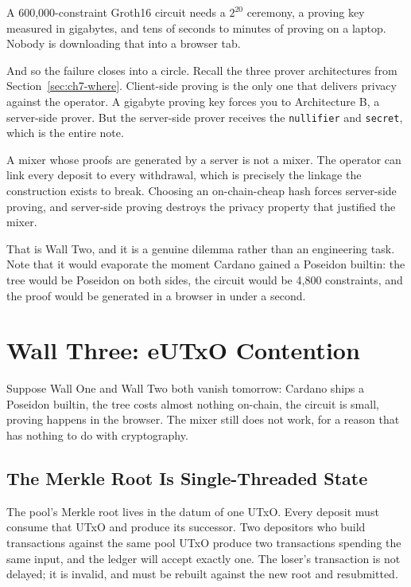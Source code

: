 A 600{,}000-constraint Groth16 circuit needs a $2^{20}$ ceremony, a proving key
measured in gigabytes, and tens of seconds to minutes of proving on a laptop.
Nobody is downloading that into a browser tab.

And so the failure closes into a circle. Recall the three prover architectures
from Section~\ref{sec:ch7-where}. Client-side proving is the only one that
delivers privacy against the operator. A gigabyte proving key forces you to
Architecture B, a server-side prover. But the server-side prover receives the
\texttt{nullifier} and \texttt{secret}, which is the entire note.

\begin{highlight}
A mixer whose proofs are generated by a server is not a mixer. The operator can
link every deposit to every withdrawal, which is precisely the linkage the
construction exists to break. Choosing an on-chain-cheap hash forces
server-side proving, and server-side proving destroys the privacy property that
justified the mixer.
\end{highlight}

That is Wall Two, and it is a genuine dilemma rather than an engineering task.
Note that it would evaporate the moment Cardano gained a Poseidon builtin: the
tree would be Poseidon on both sides, the circuit would be 4{,}800 constraints,
and the proof would be generated in a browser in under a second.

\section{Wall Three: eUTxO Contention} \label{sec:ch8-wall3}

Suppose Wall One and Wall Two both vanish tomorrow: Cardano ships a Poseidon
builtin, the tree costs almost nothing on-chain, the circuit is small, proving
happens in the browser. The mixer still does not work, for a reason that has
nothing to do with cryptography.

\subsection*{The Merkle Root Is Single-Threaded State}

The pool's Merkle root lives in the datum of one UTxO. Every deposit must
consume that UTxO and produce its successor. Two depositors who build
transactions against the same pool UTxO produce two transactions spending the
same input, and the ledger will accept exactly one. The loser's transaction
is not delayed; it is invalid, and must be rebuilt against the new root and
resubmitted.

